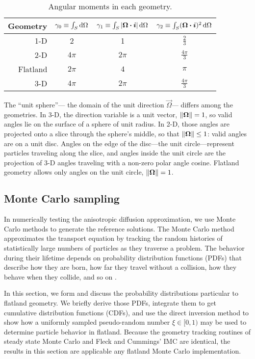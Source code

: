 \begin{table}[htb]
  \centering
  \begin{tabular}{rccc}
\toprule
   Geometry
   & $\gamma_0 \equiv \int_S \mathop{}\!\mathrm{d}\Omega$
   & $\gamma_1 \equiv \int_S \left| \bm{\Omega}\bm{\cdot}\bm{i} \right| \mathop{}\!\mathrm{d}\Omega$
   & $\gamma_2 \equiv \int_S (\bm{\Omega}\bm{\cdot}\bm{i})^2 \mathop{}\!\mathrm{d}\Omega$
\\ \midrule
   1-D & 2 & 1 & $\frac{2}{3}$
   \\
   2-D & $4\pi$ & $2\pi$ & $\frac{4\pi}{3}$
   \\
   Flatland & $2\pi$ & $4$ & $\pi$
   \\
   3-D & $4\pi$ & $2\pi$ & $\frac{4\pi}{3}$
\\ \bottomrule
  \end{tabular}
  \caption{Angular moments in each geometry.}
  \label{tab:angularMoments}
\end{table}

The ``unit sphere''---%
the domain of the unit direction $\vec{\Omega}$---%
differs among the geometries. In 3-D, the direction variable is a unit vector,
$\left\| \bm{\Omega} \right\|=1$, so valid angles
lie on the surface of a sphere of unit radius. In 2-D, those angles are
projected onto a slice through the sphere's middle, so that
$\left\| \bm{\Omega} \right\| \le 1$: valid angles are on a unit disc. Angles on the edge
of the disc---the unit circle---represent particles traveling along the slice,
and angles inside the unit circle are the projection of 3-D angles traveling with a
non-zero polar angle cosine. Flatland geometry allows only angles on the unit
circle, $\left\| \bm{\Omega} \right\|=1$.

\subsection{Monte Carlo sampling}

In numerically testing the anisotropic diffusion approximation, we use Monte Carlo
methods to generate the reference solutions.
The Monte Carlo method approximates the transport equation by tracking the
random histories of statistically large numbers of particles as they traverse a
problem. The behavior during their lifetime depends on probability distribution
functions (PDFs) that describe how they are born, how far they travel without a
collision, how they behave when they collide, and so on \cite{Lew1984,Bro2004a}.

In this section, we form and discuss the probability distributions particular to
flatland geometry. We briefly derive those PDFs,
integrate them to get cumulative distribution functions
(CDFs), and use the direct inversion method to show how a uniformly sampled
pseudo-random number $\xi \in [0,1)$ may be used to determine particle behavior
in flatland. Because the geometry tracking routines of steady state Monte Carlo
and Fleck and Cummings' IMC are identical, the results in this section are
applicable any flatland Monte Carlo implementation.

